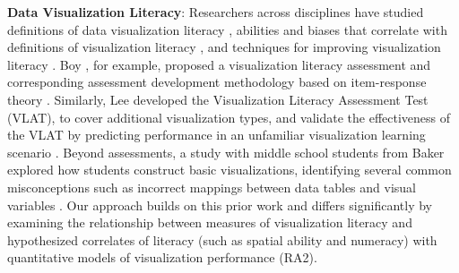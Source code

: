 \documentclass[11pt]{article}
\begin{document}
\noindent\textbf{Data Visualization Literacy}:
Researchers across disciplines have studied definitions of data visualization literacy \cite{mendez2017bottom, wolff2016data, shah1999graphs, wainer1992understanding, wainer1980test, galesic2011graph, lee2017vlat, boy2014principled, grammel2010information, baker2001toward},
abilities and biases that correlate with definitions of visualization literacy \cite{correllblack, rushmeier2007revisiting, nelson2008clinical, canham2010effects, gal2002adults, christensen1983effects, einhorn1978confidence, hinds1999curse, peck2012icd3, reyna2009numeracy, cokely2012measuring,  dragicevic2017blinded, toker2017pupillometry, herrmann2017watts, mansoor2017data},
and techniques for improving visualization literacy \cite{alper2017visualization, mcnamara2015bridging, steigrad2016new, ruchikachorn2015learning, kwon2016comparative, lee2016people, baker2004learning}.
Boy \etal, for example, proposed a visualization literacy assessment and corresponding assessment development methodology based on item-response theory \cite{boy2014principled}.
Similarly, Lee \etal developed the Visualization Literacy Assessment Test (VLAT), to cover additional visualization types, and validate the effectiveness of the VLAT by predicting performance in an unfamiliar visualization learning scenario \cite{lee2017vlat}.
Beyond assessments, a study with middle school students from Baker \etal explored how students construct basic visualizations, identifying several common misconceptions such as incorrect mappings between data tables and visual variables \cite{baker2001toward}.
Our approach builds on this prior work and differs significantly by examining the relationship between measures of visualization literacy and hypothesized correlates of literacy (such as spatial ability and numeracy) with quantitative models of visualization performance (RA2).

\end{document}
